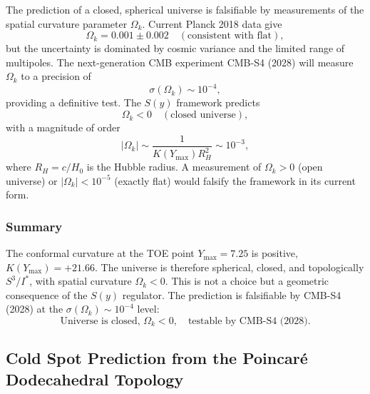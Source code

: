 \documentclass[12pt,oneside,openany]{book}
\begin{document}
The prediction of a closed, spherical universe is falsifiable by measurements of the spatial curvature parameter $\Omega_k$. Current Planck 2018 data give
\begin{equation}
\Omega_k = 0.001 \pm 0.002 \quad (\text{consistent with flat}),
\label{eq:Omega-k-Planck}
\end{equation}
but the uncertainty is dominated by cosmic variance and the limited range of multipoles. The next-generation CMB experiment CMB-S4 (2028) will measure $\Omega_k$ to a precision of
\begin{equation}
\sigma(\Omega_k) \sim 10^{-4},
\label{eq:sigma-Omegak}
\end{equation}
providing a definitive test. The $S(y)$ framework predicts
\begin{equation}
\boxed{\Omega_k < 0 \quad (\text{closed universe}),}
\label{eq:prediction-closed}
\end{equation}
with a magnitude of order
\begin{equation}
|\Omega_k| \sim \frac{1}{K(Y_{\max}) R_H^2} \sim 10^{-3},
\label{eq:Omega-k-magnitude}
\end{equation}
where $R_H = c/H_0$ is the Hubble radius. A measurement of $\Omega_k > 0$ (open universe) or $|\Omega_k| < 10^{-5}$ (exactly flat) would falsify the framework in its current form.

\subsubsection{Summary}

The conformal curvature at the TOE point $Y_{\max} = 7.25$ is positive, $K(Y_{\max}) = +21.66$. The universe is therefore spherical, closed, and topologically $S^3/I^*$, with spatial curvature $\Omega_k < 0$. This is not a choice but a geometric consequence of the $S(y)$ regulator. The prediction is falsifiable by CMB-S4 (2028) at the $\sigma(\Omega_k) \sim 10^{-4}$ level:
\begin{equation}
\boxed{\text{Universe is closed, } \Omega_k < 0, \quad \text{testable by CMB-S4 (2028).}}
\label{eq:closed-universe-summary}
\end{equation}
\subsection{Cold Spot Prediction from the Poincar\'e Dodecahedral Topology}
\label{sec:cold-spot-prediction}
\end{document}
